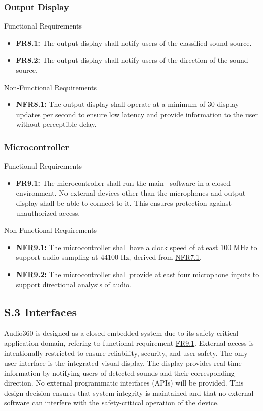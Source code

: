 \documentclass[12pt]{article}
\theoremstyle{definition}
\begin{document}
\subsubsection{\hyperref[comp:display]{Output Display}} Functional Requirements
\begin{itemize}
  \item \label{FR8_1}\textbf{FR8.1:} The output display shall notify users of
  the classified sound source.

  \item \label{FR8_2}\textbf{FR8.2:} The output display shall notify users of
  the direction of the sound source.
\end{itemize}

Non-Functional Requirements
\begin{itemize}
  \item \label{NFR8_1}\textbf{NFR8.1:} The output display shall operate at a
  minimum of 30 display updates per second to ensure low latency and provide
  information to the user without perceptible delay.
\end{itemize}

\subsubsection{\hyperref[comp:microcontroller]{Microcontroller}} Functional
Requirements
\begin{itemize}
  \item \label{FR9_1}\textbf{FR9.1:} The microcontroller shall run the main
  \progname ~software in a closed environment. No external devices other than
  the microphones and output display shall be able to connect to it. This
  ensures protection against unauthorized access.
\end{itemize}

Non-Functional Requirements
\begin{itemize}
  \item \label{NFR9_1}\textbf{NFR9.1:} The microcontroller shall have a clock
  speed of atleast 100 MHz to support audio sampling at 44100 Hz, derived from
  \hyperref[NFR7_1]{NFR7.1}.

  \item \label{FR9_2}\textbf{NFR9.2:} The microcontroller shall provide atleast
  four microphone inputs to support directional analysis of audio.
\end{itemize}


\subsection{S.3 Interfaces}
Audio360 is designed as a closed embedded system due to its safety-critical
application domain, refering to functional requirement \hyperref[FR9_1]{FR9.1}.
External access is intentionally restricted to ensure reliability, security, and
user safety. The only user interface is the integrated visual display. The
display provides real-time information by notifying users of detected sounds and
their corresponding direction. No external programmatic interfaces (APIs) will
be provided. This design decision ensures that system integrity is maintained
and that no external software can interfere with the safety-critical operation
of the device.
\end{document}
